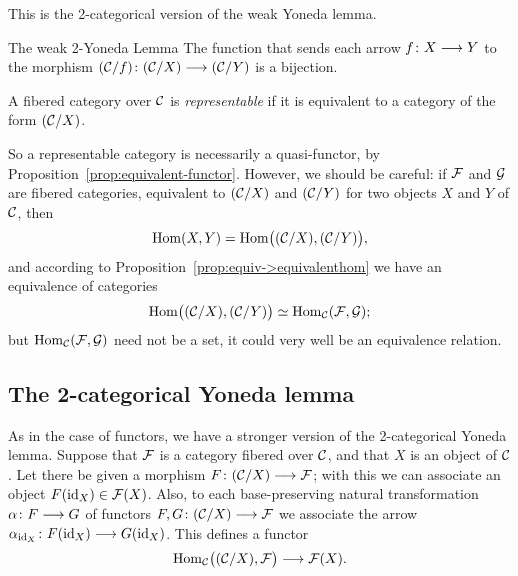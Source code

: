 \begin{3   FIBERED CATEGORIES}
\begin{3.6 Objects as fibcats and the 2-Yoneda}
This is the 2-categorical version of the weak Yoneda lemma.

\begin{named}{The weak 2-Yoneda Lemma}
%
The function that sends each arrow $f \colon X \arr Y$ to the morphism $(\cC/f) \colon (\cC/X) \arr (\cC/Y)$ is a bijection.
\end{named}

\begin{definition}
A fibered category over $\mathcal{C}$ is \emph{representable}%
%
 if it is equivalent to a category of the form $(\mathcal{C}/X)$.
\end{definition}

So a representable category is necessarily a quasi-functor, by Proposition~\ref{prop:equivalent-functor}. However, we should be careful: if $\mathcal{F}$ and $\mathcal{G}$ are fibered categories, equivalent to $(\mathcal{C}/X)$ and $(\mathcal{C}/Y)$ for two objects $X$ and $Y$ of $\mathcal{C}$, then
   \[
   \operatorname{Hom}(X, Y) = \operatorname{Hom}\bigl( (\mathcal{C}/X),
   (\mathcal{C}/Y)\bigr),
   \]
and according to Proposition~\ref{prop:equiv->equivalenthom} we have an equivalence of categories
   \[
   \operatorname{Hom}\bigl( (\mathcal{C}/X), (\mathcal{C}/Y)\bigr)
   \simeq \operatorname{Hom}_{\mathcal{C}}(\mathcal{F}, \mathcal{G});
   \]
but $\operatorname{Hom}_{\mathcal{C}}(\mathcal{F}, \mathcal{G})$ need not be a set, it could very well be an equivalence relation.



\subsection{The 2-categorical Yoneda lemma}

As in the case of functors, we have a stronger version of the 2-categorical Yoneda lemma. Suppose that $\mathcal{F}$ is a category fibered over $\mathcal{C}$, and that $X$ is an object of $\mathcal{C}$. Let there be given a morphism $F \colon (\cC/X) \arr \cF$; with this we can associate an object $F(\mathrm{id}_X) \in \mathcal{F}(X)$. Also, to each base-preserving natural transformation $\alpha\colon F \arr G$ of functors $F, G \colon (\cC/X) \arr \cF$ we associate the arrow $\alpha_{\id_X} \colon F(\id_X) \arr G(\id_X)$. This defines a functor
   \[
   \hom_{\cC}\bigl((\cC/X), \cF\bigr)
   \arr \cF(X).
   \]


\end{3.6 Objects as fibcats and the 2-Yoneda}
\end{3   FIBERED CATEGORIES}
